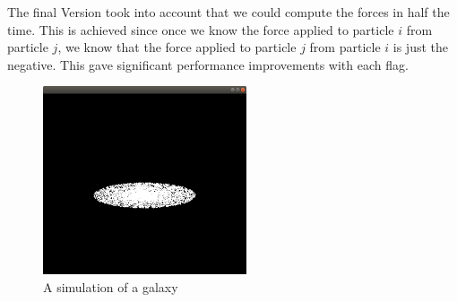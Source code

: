 The final Version took into account that we could compute the forces in half the time. This is achieved since once we know the force applied to particle $i$ from particle $j$, we know that the force applied to particle $j$ from particle $i$ is just the negative. This gave significant performance improvements with each flag.
\begin{figure}[htb]
  \begin{center}
    \includegraphics[width=6cm]{../images/space.jpg}
    \caption{A simulation of a galaxy}
  \end{center}
\end{figure}
\np
